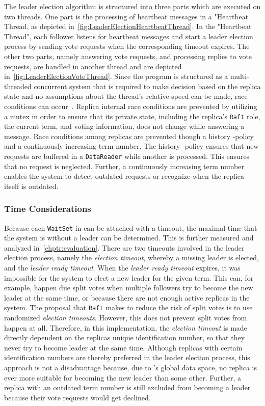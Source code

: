 The leader election algorithm is structured into three parts which are executed on two  threads.
One part is the processing of heartbeat messages in a "Heartbeat Thread, as depicted in~\autoref{fig:LeaderElectionHeartbeatThread}.
In the "Heartbeat Thread", each follower listens for heartbeat messages and start a leader election process by sending vote requests when the corresponding timeout expires.
The other two parts, namely answering vote requests, and processing replies to vote requests, are handled in another thread and are depicted in~\autoref{fig:LeaderElectionVoteThread}.
Since the program is structured as a multi-threaded concurrent system that is required to make decision based on the replica state and no assumptions about the thread's relative speed can be made, race conditions can occur~\cite{Dijkstra1965}.
Replica internal race conditions are prevented by utilizing a mutex in order to ensure that its private state, including the replica's \texttt{Raft} role, the current term, and voting information, does not change while answering a message.
Race conditions among replicas are prevented though a history -policy and a continuously increasing term number.
The history -policy ensures that new requests are buffered in a \texttt{DataReader} while another is processed.
This ensures that no request is neglected.
Further, a continuously increasing term number enables the system to detect outdated requests or recognize when the replica itself is outdated.


\subsubsection{Time Considerations}
\label{subsub:timeConsiderations}
Because each \texttt{WaitSet} in  can be attached with a timeout, the maximal time that the system is without a leader can be determined.
This is further measured and analyzed in~\autoref{chptr:evaluation}.
There are two timeouts involved in the leader election process, namely the \textit{election timeout}, whereby a missing leader is elected, and the \textit{leader ready timeout}.
When the \textit{leader ready timeout} expires, it was impossible for the system to elect a new leader for the given term.
This can, for example, happen due split votes when multiple followers try to become the new leader at the same time, or because there are not enough active replicas in the system.
The proposal that \texttt{Raft} makes to reduce the risk of split votes is to use randomized \textit{election timeouts}.
However, this does not prevent split votes from happen at all.
Therefore, in this implementation, the \textit{election timeout} is made directly dependent on the replicas unique identification number, so that they never try to become leader at the same time.
Although replicas with certain identification numbers are thereby preferred in the leader election process, this approach is not a disadvantage because, due to 's global data space, no replica is ever more suitable for becoming the new leader than some other.
Further, a replica with an outdated term number is still excluded from becoming a leader because their vote requests would get declined.

